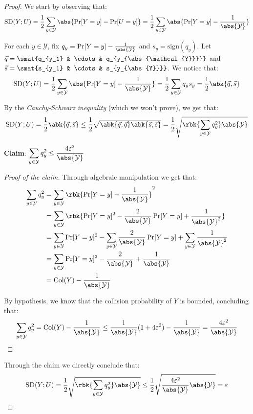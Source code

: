 \documentclass[a4paper, 12pt]{report}
\begin{document}
    \begin{proof}
        We start by observing that:
        \[\mathrm{SD}(Y; U) = \frac{1}{2} \sum_{y \in \mathcal{Y}} \abs{\Pr[Y = y] - \Pr[U = y]} = \frac{1}{2} \sum_{y \in \mathcal{Y}} \abs{\Pr[Y = y] - \frac{1}{\abs{\mathcal{Y}}}}\]

        For each $y \in \mathcal{Y}$, fix $q_y = \Pr[Y = y] - \frac{1}{\abs{\mathcal{Y}}}$ and $s_y = \mathrm{sign}(q_y)$. Let $\vec q = \smat{q_{y_1} & \cdots & q_{y_{\abs{\mathcal{Y}}}}}$ and  $\vec s = \smat{s_{y_1} & \cdots & s_{y_{\abs{Y}}}}$. We notice that:
        \[\mathrm{SD}(Y; U) = \frac{1}{2} \sum_{y \in \mathcal{Y}} \abs{\Pr[Y = y] - \frac{1}{\abs{\mathcal{Y}}}} = \frac{1}{2} \sum_{y \in \mathcal{Y}} q_y s_y = \frac{1}{2} \abk{\vec q, \vec s}\]

        By the \textit{Cauchy-Schwarz inequality} (which we won't prove), we get that:
        \[\mathrm{SD}(Y; U) = \frac{1}{2} \abk{\vec q, \vec s} \leq \frac{1}{2} \sqrt{\abk{\vec q, \vec q} \abk{\vec s, \vec s}} = \frac{1}{2} \sqrt{\rbk{\sum_{y \in \mathcal{Y}} q_y^2} \abs{\mathcal{Y}}}\]

        \textbf{Claim}: $\displaystyle \sum_{y \in \mathcal{Y}} q_y^2 \leq \frac{4\varepsilon^2}{\abs{\mathcal{Y}}}$

        \begin{proof}[Proof of the claim]
            Through algebraic manipulation we get that:
            \[\begin{split}
                \sum_{y \in \mathcal{Y}} q_y^2 &= \sum_{y \in \mathcal{Y}} \rbk{\Pr[Y = y] - \frac{1}{\abs{\mathcal{Y}}}}^2 \\
                &= \sum_{y \in \mathcal{Y}} \rbk{\Pr[Y = y]^2 - \frac{2}{\abs{\mathcal{Y}}} \Pr[Y = y] + \frac{1}{\abs{\mathcal{Y}}^2}} \\
                &= \sum_{y \in \mathcal{Y}} \Pr[Y = y]^2 - \sum_{y \in \mathcal{Y}} \frac{2}{\abs{\mathcal{Y}}} \Pr[Y = y] + \sum_{y \in \mathcal{Y}} \frac{1}{\abs{\mathcal{Y}}^2} \\
                &= \sum_{y \in \mathcal{Y}} \Pr[Y = y]^2 - \frac{2}{\abs{\mathcal{Y}}} + \frac{1}{\abs{\mathcal{Y}}} \\
                &= \mathrm{Col}(Y) - \frac{1}{\abs{\mathcal{Y}}}
            \end{split}\]

            By hypothesis, we know that the collision probability of $Y$ is bounded, concluding that:
            \[\sum_{y \in \mathcal{Y}} q_y^2 = \mathrm{Col}(Y) - \frac{1}{\abs{\mathcal{Y}}} \leq \frac{1}{\abs{\mathcal{Y}}}(1+4\varepsilon^2) - \frac{1}{\abs{\mathcal{Y}}} = \frac{4\varepsilon^2}{\abs{\mathcal{Y}}}\] 
        \end{proof}

        Through the claim we directly conclude that:
        \[\mathrm{SD}(Y;U) = \frac{1}{2} \sqrt{\rbk{\sum_{y \in \mathcal{Y}} q_y^2} \abs{\mathcal{Y}}} \leq \frac{1}{2} \sqrt{\frac{4\varepsilon^2}{\abs{\mathcal{Y}}} \abs{\mathcal{Y}}} = \varepsilon\]
    \end{proof}
\end{document}
